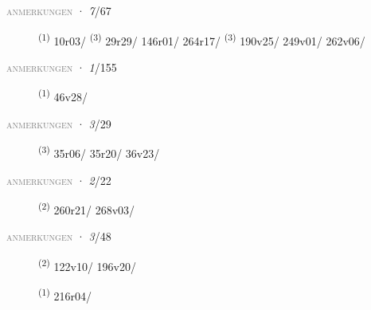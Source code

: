 \textsc{\textcolor{gray}{anmerkungen}}
\ENTRYEND
\noindent{} · \textit{7}/67 \LEMMALINE
\begin{description}
    \item[]  \textsuperscript{(1)} \mbox{10r03/} \textsuperscript{(3)} \mbox{29r29/} \mbox{146r01/} \mbox{264r17/} \textsuperscript{(3)} \mbox{190v25/} \mbox{249v01/} \mbox{262v06/}
\end{description}
\textsc{\textcolor{gray}{anmerkungen}}
\ENTRYEND
\noindent{} · \textit{1}/155 \LEMMALINE
\begin{description}
    \item[]  \textsuperscript{(1)} \mbox{46v28/}
\end{description}
\textsc{\textcolor{gray}{anmerkungen}}
\ENTRYEND
\noindent{} · \textit{3}/29 \LEMMALINE
\begin{description}
    \item[]  \textsuperscript{(3)} \mbox{35r06/} \mbox{35r20/} \mbox{36v23/}
\end{description}
\textsc{\textcolor{gray}{anmerkungen}}
\ENTRYEND
\noindent{} · \textit{2}/22 \LEMMALINE
\begin{description}
    \item[]  \textsuperscript{(2)} \mbox{260r21/} \mbox{268v03/}
\end{description}
\textsc{\textcolor{gray}{anmerkungen}}
\ENTRYEND
\noindent{} · \textit{3}/48 \LEMMALINE
\begin{description}
    \item[]  \textsuperscript{(2)} \mbox{122v10/} \mbox{196v20/}
    \item[]  \textsuperscript{(1)} \mbox{216r04/}
\end{description}
